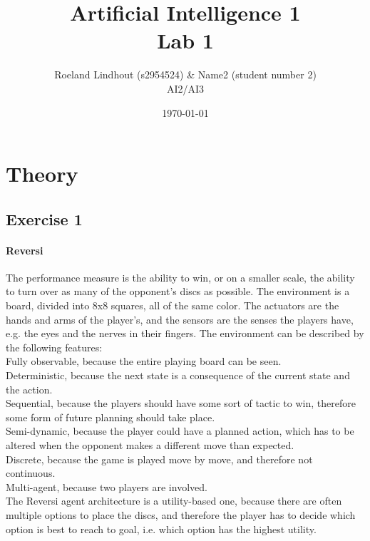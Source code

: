 \documentclass{article}
\title{Artificial Intelligence 1 \\ Lab 1}%
\author{Roeland Lindhout (s2954524) \& Name2 (student number 2) \\ AI2/AI3} %
\date{\today}%
\begin{document}
	
	\maketitle
	
	\section*{Theory}
	\subsection*{Exercise 1}
	\paragraph{Reversi} The performance measure is the ability to win, or on a smaller scale, the ability to turn over as many of the opponent's discs as possible. The environment is a board, divided into 8x8 squares, all of the same color. The actuators are the hands and arms of the player's, and the sensors are the senses the players have, e.g. the eyes and the nerves in their fingers. The environment can be described by the following features: \\
	Fully observable, because the entire playing board can be seen. \\
	Deterministic, because the next state is a consequence of the current state and the action. \\
	Sequential, because the players should have some sort of tactic to win, therefore some form of future planning should take place. \\
	Semi-dynamic, because the player could have a planned action, which has to be altered when the opponent makes a different move than expected. \\
	Discrete, because the game is played move by move, and therefore not continuous. \\
	Multi-agent, because two players are involved. \\
	The Reversi agent architecture is a utility-based one, because there are often multiple options to place the discs, and therefore the player has to decide which option is best to reach to goal, i.e. which option has the highest utility.
	
\end{document}
